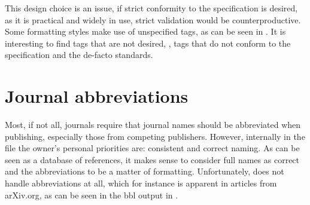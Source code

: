 This design choice is an issue, if strict conformity to the
specification is desired, as it is practical and widely in use, strict
validation would be counterproductive.  Some formatting styles make
use of unspecified tags, as can be seen in
. It is interesting to find tags that are
not desired, \ie, tags that do not conform to the specification and
the de-facto standards.


\section{Journal abbreviations}
\label{sec:problems_abbreviations}

Most, if not all, journals require that journal names should be
abbreviated when publishing, especially those from competing
publishers.  However, internally in the {\bibtex} file the owner's
personal priorities are: consistent and correct naming.  As {\bibtex}
can be seen as a database of references, it makes sense to consider
full names as correct and the abbreviations to be a matter of
formatting.  Unfortunately, {\bibtex} does not handle abbreviations at
all, which for instance is apparent in articles from arXiv.org, as can
be seen in the bbl output in .

